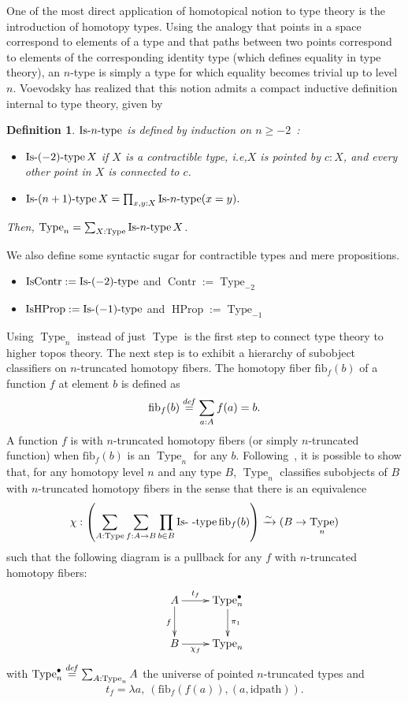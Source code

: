 \documentclass[conference]{IEEEtran}
\newtheorem{defi}[thm]{Definition}
\newcommand \defeq {\overset{de\hspace{-0.2ex}f}{=}}
\newcommand{\ie}{i.e,\xspace}
\DeclareMathOperator{\Type}{Type}
\DeclareMathOperator{\HProp}{HProp}
\DeclareMathOperator{\IsHProp}{IsHProp}
\DeclareMathOperator{\Contr}{Contr}
\DeclareMathOperator{\IsContr}{IsContr}
\def\mymathhyphen{{\hbox{-}}}
\newcommand{\IsType}[1]{\mathop{\mathrm{Is\mymathhyphen}#1\mathrm{\mymathhyphen
      type}} }
\newcommand \fib[2] {\mathrm{fib}_{#1}(#2)}
\begin{document}
One of the most direct application of homotopical notion to type
theory is the introduction of homotopy types. 
%
Using the analogy that points in a space correspond to elements of a
type and that paths between two points correspond to 
elements of the corresponding identity type (which defines equality in type theory),  
%
an $n$-type is simply a type
for which equality becomes trivial up to level $n$. 
%
Voevodsky has realized that this notion admits a compact inductive definition
internal to type theory, given by
\begin{defi}
  $\IsType n$ is defined by induction on $n\geqslant -2$~:
  \begin{itemize}
  \item $\IsType {(-2)} X$ if $X$ is a contractible type, \ie $X$
    is pointed by $c:X$, and every other point in $X$ is connected to $c$.
  \item $\IsType {(n+1)} X = \prod_{x,y:X} \IsType n (x=y).$
  \end{itemize}
  Then, $\Type_n = \sum_{X:\Type} \IsType n X$.
\end{defi}
%
We also define some syntactic sugar for contractible types and mere propositions.

\begin{itemize}
\item $\IsContr := \IsType {(-2)}$ and $\Contr := \Type_{-2}$
\item $\IsHProp := \IsType {(-1)}$ and $\HProp := \Type_{-1}$
\end{itemize}

Using $\Type_n$ instead of just $\Type$ is the first step to connect
type theory to higher topos theory. The next step is to exhibit a
hierarchy of subobject classifiers on $n$-truncated homotopy fibers.
%
The homotopy fiber $\fib{f}{b}$ of a function $f$ at element $b$ is
defined as 
$$
\fib{f}{b} \defeq \sum_{a:A} f(a) = b.
$$ 
%
A function $f$ is with $n$-truncated homotopy fibers (or simply
$n$-truncated function) when $\fib{f}{b}$
is an $\Type_n$ for any $b$.  
%
Following~\cite{sets_in_hott}, it is possible to show that, for any
homotopy level $n$ and any type $B$, $\Type_n$ classifies subobjects
of $B$ with $n$-truncated homotopy fibers in the sense that there is
an equivalence
%
$$\chi : \left(\sum_{A:\Type} \sum_{f:A \to B} \prod_{b\in B}
\IsType \
\fib{f}{b}\right) \xrightarrow{\sim} 
 (B \to \Type_n)$$
%
 such that the following diagram is a pullback for any $f$ with
 $n$-truncated homotopy fibers:
$$
\xymatrix{
  A \ar[r]^{\hspace{-1em} t_f} \ar[d]_f & \Type_n^\bullet \ar[d]^{\pi_1}\\
  B \ar[r]_{\hspace{-1em} \chi_f} & \Type_n
}
$$
with $\Type_n^\bullet \defeq \sum_{A:\Type_n} A$ the universe of pointed
$n$-truncated types and 
$$t_f = \lambda a,~(\fib{f}{f(a)},(a,\mathrm{idpath})).$$
\end{document}
